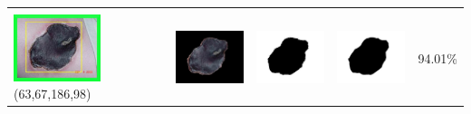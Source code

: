 \begin{table}[H]
\begin{tabular}{|m{1.0in}|m{1.0in}|m{1.0in}|m{1.0in}|m{0.6in}|}
		&  &  & \\
		\includegraphics[width=1.0in]{gambar/hasil_segmentasi/luka_hitam/image_26_rect.jpg} {\centering\fontsize{10}{10}\selectfont(63,67,186,98)}&
		\includegraphics[width=1.0in]{gambar/hasil_segmentasi/luka_hitam/result_26.jpg}&
		\includegraphics[width=1.0in]{gambar/hasil_segmentasi/luka_hitam/mask_r_26.jpg}&
		\includegraphics[width=1.0in]{gambar/hasil_segmentasi/luka_hitam/26_r.jpg}&
		94.01\% \\
		\hline 
	\end{tabular}
\end{table}

